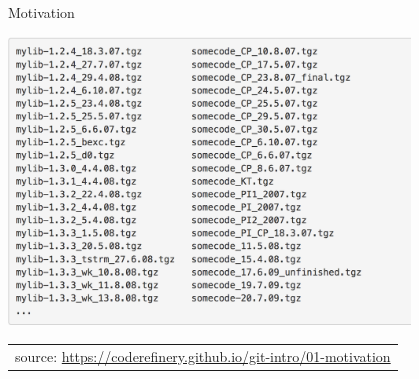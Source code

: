 \begin{frame}{Motivation}

\begin{center}
  \includegraphics[width=0.8\textwidth]{pics/poormans_version_control}
\end{center}



\tiny
\begin{tabular}{l}
source: \url{https://coderefinery.github.io/git-intro/01-motivation}
\end{tabular}

\end{frame}
